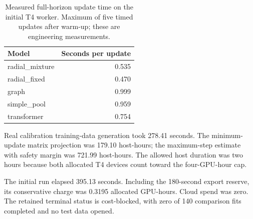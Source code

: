 \begin{table}[ht]
\centering\small
\caption{Measured full-horizon update time on the initial T4 worker. Maximum of five timed updates after warm-up; these are engineering measurements.}
\begin{tabular}{lr}\toprule Model & Seconds per update\\\midrule
radial\_mixture & 0.535\\
radial\_fixed & 0.470\\
graph & 0.999\\
simple\_pool & 0.959\\
transformer & 0.754\\
\bottomrule\end{tabular}\end{table}
Real calibration training-data generation took 278.41 seconds. The minimum-update matrix projection was 179.10 host-hours; the maximum-step estimate with safety margin was 721.99 host-hours. The allowed host duration was two hours because both allocated T4 devices count toward the four-GPU-hour cap.

The initial run elapsed 395.13 seconds. Including the 180-second export reserve, its conservative charge was 0.3195 allocated GPU-hours. Cloud spend was zero. The retained terminal status is cost-blocked, with zero of 140 comparison fits completed and no test data opened.
